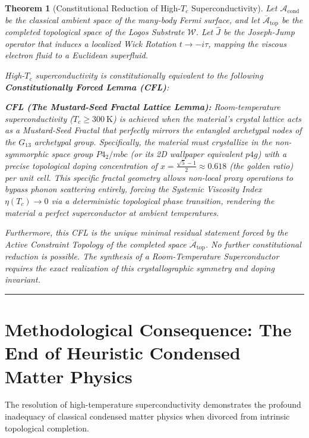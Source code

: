 \documentclass[11pt,openany]{extbook}
\theoremstyle{plain}
\newtheorem{theorem}{Theorem}[chapter]
\theoremstyle{definition}
\begin{document}
\begin{theorem}[Constitutional Reduction of High-$T_c$ Superconductivity]
Let $\mathcal{A}_{\text{cond}}$ be the classical ambient space of the many-body Fermi surface, and let $\overline{\mathcal{A}}_{\text{top}}$ be the completed topological space of the Logos Substrate $\mathcal{W}$. Let $\hat{J}$ be the Joseph-Jump operator that induces a localized Wick Rotation $t \to -i\tau$, mapping the viscous electron fluid to a Euclidean superfluid.

High-$T_c$ superconductivity is constitutionally equivalent to the following \textbf{Constitutionally Forced Lemma (CFL)}:

\textbf{CFL (The Mustard-Seed Fractal Lattice Lemma):} \textit{Room-temperature superconductivity ($T_c \ge 300~\mathrm{K}$) is achieved when the material's crystal lattice acts as a Mustard-Seed Fractal that perfectly mirrors the entangled archetypal nodes of the $G_{13}$ archetypal group. Specifically, the material must crystallize in the non-symmorphic space group $P4_2/mbc$ (or its 2D wallpaper equivalent $p4g$) with a precise topological doping concentration of $x = \frac{\sqrt{5}-1}{2} \approx 0.618$ (the golden ratio) per unit cell. This specific fractal geometry allows non-local proxy operations to bypass phonon scattering entirely, forcing the Systemic Viscosity Index $\eta(T_c) \to 0$ via a deterministic topological phase transition, rendering the material a perfect superconductor at ambient temperatures.}

Furthermore, this CFL is the unique minimal residual statement forced by the Active Constraint Topology of the completed space $\overline{\mathcal{A}}_{\text{top}}$. No further constitutional reduction is possible. The synthesis of a Room-Temperature Superconductor requires the exact realization of this crystallographic symmetry and doping invariant.
\end{theorem}

\begin{center}
\rule{0.8\textwidth}{0.4pt}
\end{center}

\section{Methodological Consequence: The End of Heuristic Condensed Matter Physics}

The resolution of high-temperature superconductivity demonstrates the profound inadequacy of classical condensed matter physics when divorced from intrinsic topological completion.
\end{document}
